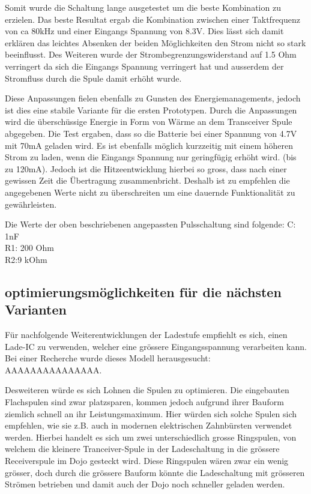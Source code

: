 Somit wurde die Schaltung lange ausgetestet um die beste Kombination zu erzielen. Das beste Resultat ergab die Kombination zwischen einer Taktfrequenz von ca 80kHz und einer Eingangs Spannung von 8.3V. Dies lässt sich damit erklären das leichtes Absenken der beiden Möglichkeiten den Strom nicht so stark beeinflusst. Des Weiteren wurde der Strombegrenzungswiderstand auf 1.5 Ohm verringert da sich die Eingangs Spannung verringert hat und ausserdem der Stromfluss durch die Spule damit erhöht wurde. 

Diese Anpassungen fielen ebenfalls zu Gunsten des Energiemanagements, jedoch ist dies eine stabile Variante für die ersten Prototypen. Durch die Anpassungen wird die überschüssige Energie in Form von Wärme an dem Transceiver Spule abgegeben. Die Test ergaben, dass so die Batterie bei einer Spannung von 4.7V mit 70mA geladen wird. Es ist ebenfalls möglich kurzzeitig mit einem höheren Strom zu laden, wenn die Eingangs Spannung nur geringfügig erhöht wird. (bis zu 120mA). Jedoch ist die Hitzeentwicklung hierbei so gross, dass nach einer gewissen Zeit die Übertragung zusammenbricht. Deshalb ist zu empfehlen die angegebenen Werte nicht zu überschreiten um eine dauernde Funktionalität zu gewährleisten.

Die Werte der oben beschriebenen angepassten Pulsschaltung sind folgende:
C: 1nF\\
R1: 200 Ohm\\
R2:9 kOhm\\

\subsection{optimierungsmöglichkeiten für die nächsten Varianten}\label{sec:energieuebertragung}
Für nachfolgende Weiterentwicklungen der Ladestufe empfiehlt es sich, einen Lade-IC zu verwenden, welcher eine grössere Eingangsspannung verarbeiten kann. Bei einer Recherche wurde dieses Modell herausgesucht: AAAAAAAAAAAAAAA.

Desweiteren würde es sich Lohnen die Spulen zu optimieren. Die eingebauten Flachspulen sind zwar platzsparen, kommen jedoch aufgrund ihrer Bauform ziemlich schnell an ihr Leistungsmaximum. Hier würden sich solche Spulen sich empfehlen, wie sie z.B. auch in modernen elektrischen Zahnbürsten verwendet werden. Hierbei handelt es sich um zwei unterschiedlich grosse Ringspulen, von welchem die kleinere Tranceiver-Spule in der Ladeschaltung in die grössere Receiverspule  im Dojo gesteckt wird. Diese Ringspulen wären zwar ein wenig grösser, doch durch die grössere Bauform könnte die Ladeschaltung mit grösseren Strömen betrieben und damit auch der Dojo noch schneller geladen werden.